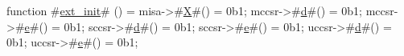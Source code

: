 function #\hyperref[sailRISCVzextzyinit]{ext\_init}# () = {
  misa->#\hyperref[sailRISCVzX]{X}#() = 0b1;
  mccsr->#\hyperref[sailRISCVzd]{d}#() = 0b1;
  mccsr->#\hyperref[sailRISCVze]{e}#() = 0b1;
  sccsr->#\hyperref[sailRISCVzd]{d}#() = 0b1;
  sccsr->#\hyperref[sailRISCVze]{e}#() = 0b1;
  uccsr->#\hyperref[sailRISCVzd]{d}#() = 0b1;
  uccsr->#\hyperref[sailRISCVze]{e}#() = 0b1;
}
